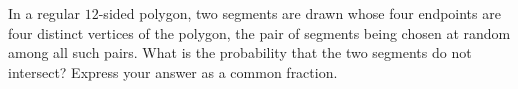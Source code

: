 In a regular $12$-sided polygon, two segments are drawn whose four endpoints are four distinct vertices of the polygon, the pair of segments being chosen at random among all such pairs. What is the probability that the two segments do not intersect? Express your answer as a common fraction.
